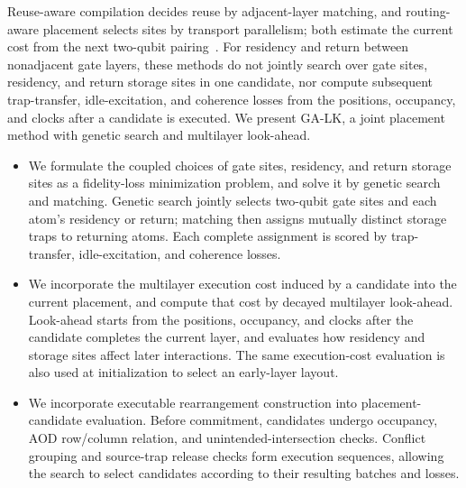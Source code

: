 Reuse-aware compilation decides reuse by adjacent-layer matching, and routing-aware placement selects sites by transport parallelism; both estimate the current cost from the next two-qubit pairing~\cite{lin2025zac,stade2025routingaware}. For residency and return between nonadjacent gate layers, these methods do not jointly search over gate sites, residency, and return storage sites in one candidate, nor compute subsequent trap-transfer, idle-excitation, and coherence losses from the positions, occupancy, and clocks after a candidate is executed. We present GA-LK, a joint placement method with genetic search and multilayer look-ahead.
\begin{itemize}
  \item We formulate the coupled choices of gate sites, residency, and return storage sites as a fidelity-loss minimization problem, and solve it by genetic search and matching. Genetic search jointly selects two-qubit gate sites and each atom's residency or return; matching then assigns mutually distinct storage traps to returning atoms. Each complete assignment is scored by trap-transfer, idle-excitation, and coherence losses.
  \item We incorporate the multilayer execution cost induced by a candidate into the current placement, and compute that cost by decayed multilayer look-ahead. Look-ahead starts from the positions, occupancy, and clocks after the candidate completes the current layer, and evaluates how residency and storage sites affect later interactions. The same execution-cost evaluation is also used at initialization to select an early-layer layout.
  \item We incorporate executable rearrangement construction into placement-candidate evaluation. Before commitment, candidates undergo occupancy, AOD row/column relation, and unintended-intersection checks. Conflict grouping and source-trap release checks form execution sequences, allowing the search to select candidates according to their resulting batches and losses.
\end{itemize}

